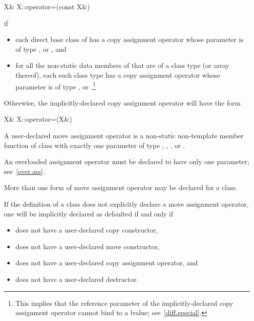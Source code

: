 \begin{codeblock}
X& X::operator=(const X&)
\end{codeblock}

if

\begin{itemize}
\item
each direct base class
of
has a copy assignment operator whose parameter is of type
,
or
,
and
\item
for all the non-static data members of
that are of a class type
(or array thereof),
each such class type has a copy assignment operator whose parameter is of type
,
or
.\footnote{This implies that the reference parameter of the
implicitly-declared copy assignment operator cannot bind to a
lvalue; see~\ref{diff.special}.}
\end{itemize}

Otherwise, the implicitly-declared copy
assignment operator
will have the form

\begin{codeblock}
X& X::operator=(X&)
\end{codeblock}

\pnum
A user-declared move assignment operator  is
a non-static non-template member function of class  with exactly
one parameter of type , , , or
. \begin{note} An overloaded assignment operator must be
declared to have only one parameter; see~\ref{over.ass}. \end{note}{}
\begin{note} More
than one form of move assignment operator may be declared for a class. \end{note}

\pnum
{}%
If the definition of a class  does not explicitly declare a
move assignment operator, one
will be implicitly declared as defaulted if and only if

\begin{itemize}
\item
{} does not have a user-declared copy constructor,

\item
{} does not have a user-declared move constructor,

\item
{} does not have a user-declared copy assignment operator, and

\item
{} does not have a user-declared destructor.
\end{itemize}

